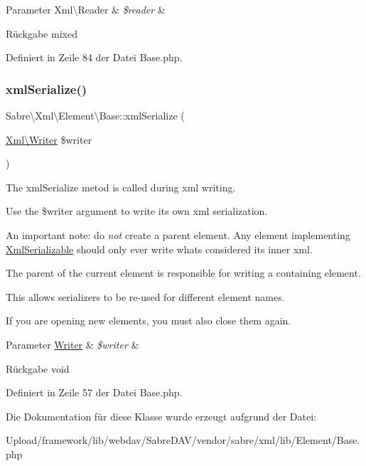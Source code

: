 \begin{DoxyParams}[1]{Parameter}
Xml\textbackslash{}\+Reader & {\em \$reader} & \\
\hline
\end{DoxyParams}
\begin{DoxyReturn}{Rückgabe}
mixed 
\end{DoxyReturn}


Definiert in Zeile 84 der Datei Base.\+php.

\mbox{\label{class_sabre_1_1_xml_1_1_element_1_1_base_a2666be672b289416482fbb23e1045dad}} 
\subsubsection{\texorpdfstring{xml\+Serialize()}{xmlSerialize()}}
{\footnotesize\ttfamily Sabre\textbackslash{}\+Xml\textbackslash{}\+Element\textbackslash{}\+Base\+::xml\+Serialize (\begin{DoxyParamCaption}\item[{\mbox{\hyperlink{class_sabre_1_1_xml_1_1_writer}{Xml\textbackslash{}\+Writer}}}]{\$writer }\end{DoxyParamCaption})}

The xml\+Serialize metod is called during xml writing.

Use the \$writer argument to write its own xml serialization.

An important note\+: do {\itshape not} create a parent element. Any element implementing \mbox{\hyperlink{interface_sabre_1_1_xml_1_1_xml_serializable}{Xml\+Serializable}} should only ever write what\textquotesingle{}s considered its \textquotesingle{}inner xml\textquotesingle{}.

The parent of the current element is responsible for writing a containing element.

This allows serializers to be re-\/used for different element names.

If you are opening new elements, you must also close them again.


\begin{DoxyParams}[1]{Parameter}
\mbox{\hyperlink{class_sabre_1_1_xml_1_1_writer}{Writer}} & {\em \$writer} & \\
\hline
\end{DoxyParams}
\begin{DoxyReturn}{Rückgabe}
void 
\end{DoxyReturn}


Definiert in Zeile 57 der Datei Base.\+php.



Die Dokumentation für diese Klasse wurde erzeugt aufgrund der Datei\+:\begin{DoxyCompactItemize}
\item 
Upload/framework/lib/webdav/\+Sabre\+D\+A\+V/vendor/sabre/xml/lib/\+Element/Base.\+php\end{DoxyCompactItemize}
